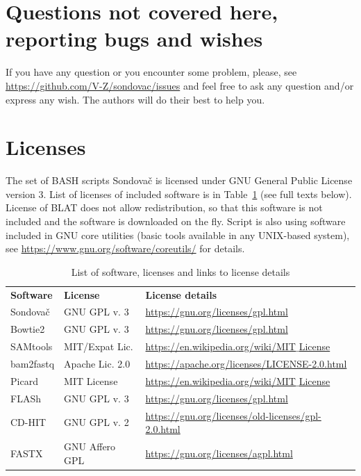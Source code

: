 \documentclass[a4paper, 11pt, twoside]{article}
\begin{document}
\section{Questions not covered here, reporting bugs and wishes}

If you have any question or you encounter some problem, please, see \href{https://github.com/V-Z/sondovac/issues}{https://github.com/V-Z/sondovac/issues} and feel free to ask any question and/or express any wish. The authors will do their best to help you.

\section{Licenses}

The set of BASH scripts Sondovač is licensed under GNU General Public License version 3. List of licenses of included software is in Table~\ref{software-lic} (see full texts below). License of BLAT does not allow redistribution, so that this software is not included and the software is downloaded on the fly. Script is also using software included in GNU core utilities (basic tools available in any UNIX-based system), see \href{https://www.gnu.org/software/coreutils/}{https://www.gnu.org/software/coreutils/} for details.

\begin{table}[htb]
\caption[List of software and licenses]{List of software, licenses and links to license details}
\begin{tabular}{lll}
\textbf{Software} & \textbf{License} & \textbf{License details}\\
Sondovač & GNU GPL v. 3 & \href{https://gnu.org/licenses/gpl.html}{https://gnu.org/licenses/gpl.html}\\
Bowtie2 & GNU GPL v. 3 & \href{https://gnu.org/licenses/gpl.html}{https://gnu.org/licenses/gpl.html}\\
SAMtools & MIT/Expat Lic. & \href{https://en.wikipedia.org/wiki/MIT_License}{https://en.wikipedia.org/wiki/MIT$\_$License}\\
bam2fastq & Apache Lic. 2.0 & \href{https://apache.org/licenses/LICENSE-2.0.html}{https://apache.org/licenses/LICENSE-2.0.html}\\
Picard & MIT License & \href{https://en.wikipedia.org/wiki/MIT_License}{https://en.wikipedia.org/wiki/MIT$\_$License}\\
FLASh & GNU GPL v. 3 & \href{https://gnu.org/licenses/gpl.html}{https://gnu.org/licenses/gpl.html}\\
CD-HIT & GNU GPL v. 2 & \href{https://gnu.org/licenses/old-licenses/gpl-2.0.html}{https://gnu.org/licenses/old-licenses/gpl-2.0.html}\\
FASTX & GNU Affero GPL & \href{https://gnu.org/licenses/agpl.html}{https://gnu.org/licenses/agpl.html}
\end{tabular}
\label{software-lic}
\end{table}
\end{document}
